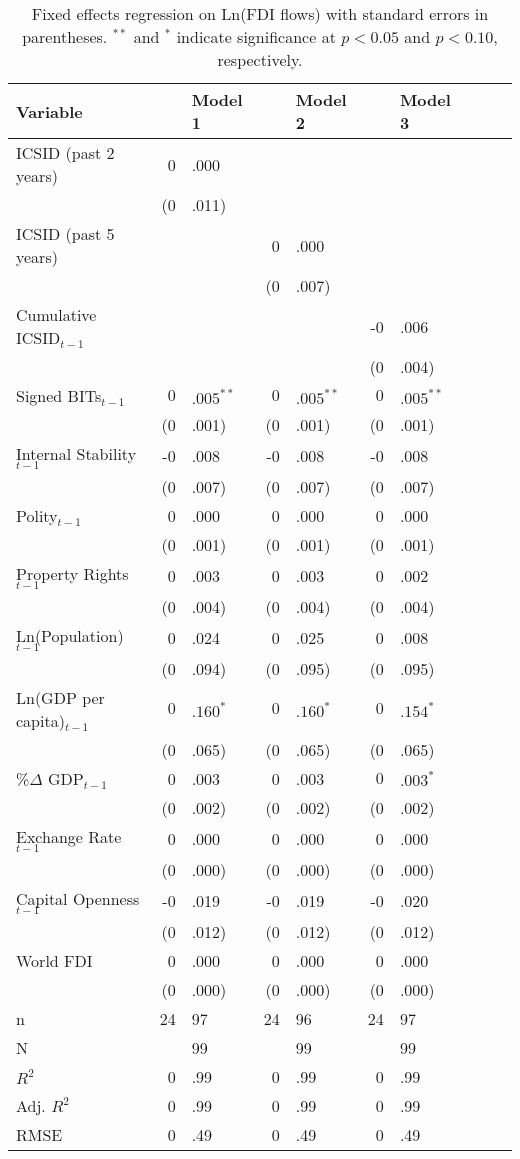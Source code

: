 \documentclass[12pt,onesided]{amsart}
\begin{document}
\begin{table}[ht]
\centering
{\footnotesize
\label{tab:dispFDI}
\begin{tabular}{ lr@{} lr@{}lr@{}lr@{}lr@{} }
 Variable && Model 1 && Model 2 && Model 3 \\ 
  \hline
\hline
ICSID (past 2 years) & 0&.000 &&  &&  \\ 
   & (0&.011) &&  &&  \\ 
  ICSID (past 5 years) &&  & 0&.000 &&  \\ 
   &&  & (0&.007) &&  \\ 
  Cumulative ICSID$_{t-1}$ &&  &&  & -0&.006 \\ 
   &&  &&  & (0&.004) \\ 
  Signed BITs$_{t-1}$ & $0$&$.005^{\ast\ast}$ & $0$&$.005^{\ast\ast}$ & $0$&$.005^{\ast\ast}$ \\ 
   & (0&.001) & (0&.001) & (0&.001) \\ 
  Internal Stability$_{t-1}$ & -0&.008 & -0&.008 & -0&.008 \\ 
   & (0&.007) & (0&.007) & (0&.007) \\ 
  Polity$_{t-1}$ & 0&.000 & 0&.000 & 0&.000 \\ 
   & (0&.001) & (0&.001) & (0&.001) \\ 
  Property Rights$_{t-1}$ & 0&.003 & 0&.003 & 0&.002 \\ 
   & (0&.004) & (0&.004) & (0&.004) \\ 
  Ln(Population)$_{t-1}$ & 0&.024 & 0&.025 & 0&.008 \\ 
   & (0&.094) & (0&.095) & (0&.095) \\ 
  Ln(GDP per capita)$_{t-1}$ & $0$&$.160^{\ast}$ & $0$&$.160^{\ast}$ & $0$&$.154^{\ast}$ \\ 
   & (0&.065) & (0&.065) & (0&.065) \\ 
  \%$\Delta$ GDP$_{t-1}$ & 0&.003 & 0&.003 & $0$&$.003^{\ast}$ \\ 
   & (0&.002) & (0&.002) & (0&.002) \\ 
  Exchange Rate$_{t-1}$ & 0&.000 & 0&.000 & 0&.000 \\ 
   & (0&.000) & (0&.000) & (0&.000) \\ 
  Capital Openness$_{t-1}$ & -0&.019 & -0&.019 & -0&.020 \\ 
   & (0&.012) & (0&.012) & (0&.012) \\ 
  World FDI & 0&.000 & 0&.000 & 0&.000 \\ 
   & (0&.000) & (0&.000) & (0&.000) \\ 
   \hline
n & 24&97 & 24&96 & 24&97 \\ 
  N && 99 && 99 && 99 \\ 
  $R^{2}$ & 0&.99 & 0&.99 & 0&.99 \\ 
  Adj. $R^{2}$ & 0&.99 & 0&.99 & 0&.99 \\ 
  RMSE & 0&.49 & 0&.49 & 0&.49 \\ 
   \hline
\hline
\end{tabular}
}
\caption{Fixed effects regression on Ln(FDI flows) with standard errors in parentheses. $^{**}$ and $^{*}$ indicate significance at $p< 0.05 $ and $p< 0.10 $, respectively.} 
\end{table}
\end{document}

